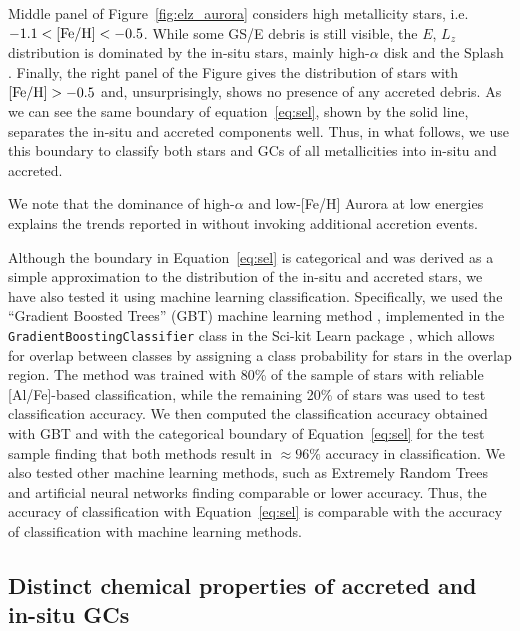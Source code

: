 \documentclass[a4paper,useAMS,usenatbib]{mnras}
\begin{document}
Middle panel of Figure~\ref{fig:elz_aurora} considers high metallicity stars, i.e. $-1.1<\rm [Fe/H]<-0.5$. While some GS/E debris is still visible, the $E$, $L_z$ distribution is dominated by the in-situ stars, mainly high-$\alpha$ disk and the Splash \citep[see][]{Splash}. Finally, the right panel of the Figure gives the distribution of stars with $\rm [Fe/H]>-0.5$ and, unsurprisingly, shows no presence of any accreted debris. 
As we can see the same boundary of equation~\ref{eq:sel}, shown by the solid line, separates the in-situ and accreted components well. 
Thus, in what follows, we use this boundary to classify both stars and GCs of all metallicities into in-situ and accreted.

We note that the dominance of high-$\alpha$ and low-[Fe/H] Aurora at low energies explains the trends reported in \citet{Donlon2023} without invoking additional accretion events.

Although the boundary in Equation~\ref{eq:sel} is categorical and was derived as a simple approximation to the distribution of the in-situ and accreted stars, we have also tested it using
machine learning classification. Specifically, we used the ``Gradient Boosted Trees'' (GBT) machine learning method  \citep{Friedman.2001}, implemented in the {\tt GradientBoostingClassifier} class in the Sci-kit Learn package \citep{sklearn}, which allows for overlap between classes by assigning a class probability for stars in the overlap region. The method was trained with 80\% of the sample of stars with reliable [Al/Fe]-based classification, while the remaining 20\% of stars was used to test classification accuracy. We then computed the classification accuracy obtained with GBT  and with the categorical boundary of Equation~\ref{eq:sel} for the test sample finding that both methods result in $\approx 96\%$ accuracy in classification. We also tested other machine learning methods, such as Extremely Random Trees and artificial neural networks finding comparable or lower accuracy. 
Thus, the accuracy of classification with Equation~\ref{eq:sel} is comparable with the accuracy of classification with machine learning methods. 


\subsection{Distinct chemical properties of accreted and in-situ GCs}
\end{document}
